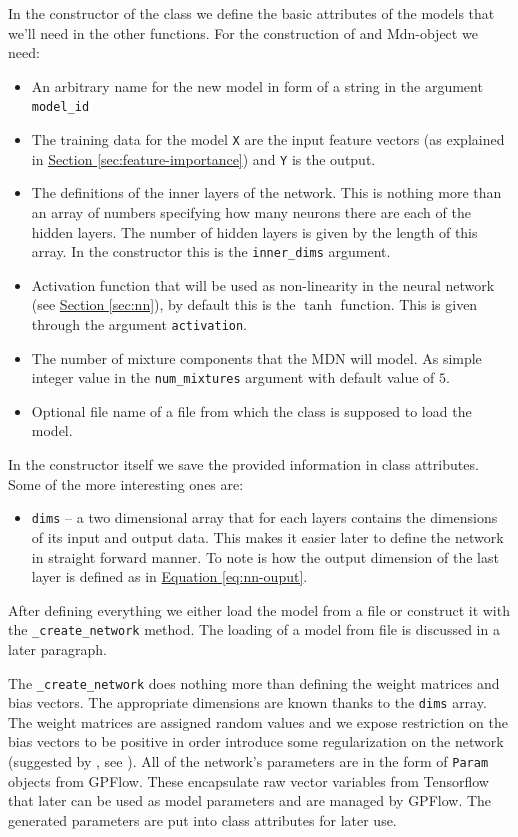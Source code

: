 \documentclass[12pt,a4paper,twoside]{scrartcl}
\numberwithin{equation}{section}
\newcommand{\refsec}[1]{\hyperref[#1]{Section \ref*{#1}}}
\renewcommand*{\refeq}[1]{\hyperref[#1]{Equation \ref*{#1}}}
\begin{document}
In the constructor of the class we define the basic attributes of the models that we'll need in the other functions. For the construction of and Mdn-object we need:
\begin{itemize}
\item An arbitrary name for the new model in form of a string in the argument \texttt{model\_id}
\item The training data for the model \texttt{X} are the input feature vectors (as explained in \refsec{sec:feature-importance}) and \texttt{Y} is the output.
\item The definitions of the inner layers of the network. This is nothing more than an array of numbers specifying how many neurons there are each of the hidden layers. The number of hidden layers is given by the length of this array. In the constructor this is the \texttt{inner\_dims} argument.
\item Activation function that will be used as non-linearity in the neural network (see \refsec{sec:nn}), by default this is the \(\tanh\) function. This is given through the argument \texttt{activation}.
\item The number of mixture components that the MDN will model. As simple integer value in the \texttt{num\_mixtures} argument with default value of \(5\).
\item Optional file name of a file from which the class is supposed to load the model.
\end{itemize}
In the constructor itself we save the provided information in class attributes. Some of the more interesting ones are:
\begin{itemize}
\item \texttt{dims} -- a two dimensional array that for each layers contains the dimensions of its input and output data. This makes it easier later to define the network in straight forward manner. To note is how the output dimension of the last layer is defined as in \refeq{eq:nn-ouput}.
\end{itemize}
After defining everything we either load the model from a file or construct it with the \texttt{\_create\_network} method. The loading of a model from file is discussed in a later paragraph.

The \texttt{\_create\_network} does nothing more than defining the weight matrices and bias vectors. The appropriate dimensions are known thanks to the \texttt{dims} array. The weight matrices are assigned random values and we expose restriction on the bias vectors to be positive in order introduce some regularization on the network (suggested by \cite{mdntut}, see \cite{hinz18}). All of the network's parameters are in the form of \texttt{Param} objects from GPFlow. These encapsulate raw vector variables from Tensorflow that later can be used as model parameters and are managed by GPFlow. The generated parameters are put into class attributes for later use.
\end{document}
